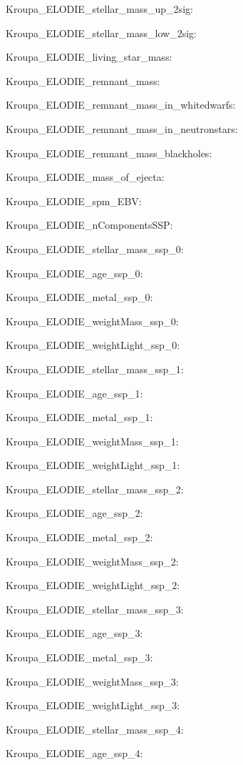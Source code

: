 \item Kroupa\_ELODIE\_stellar\_mass\_up\_2sig: 
\item Kroupa\_ELODIE\_stellar\_mass\_low\_2sig: 
\item Kroupa\_ELODIE\_living\_star\_mass: 
\item Kroupa\_ELODIE\_remnant\_mass: 
\item Kroupa\_ELODIE\_remnant\_mass\_in\_whitedwarfs: 
\item Kroupa\_ELODIE\_remnant\_mass\_in\_neutronstars: 
\item Kroupa\_ELODIE\_remnant\_mass\_blackholes: 
\item Kroupa\_ELODIE\_mass\_of\_ejecta: 
\item Kroupa\_ELODIE\_spm\_EBV: 
\item Kroupa\_ELODIE\_nComponentsSSP: 
\item Kroupa\_ELODIE\_stellar\_mass\_ssp\_0: 
\item Kroupa\_ELODIE\_age\_ssp\_0: 
\item Kroupa\_ELODIE\_metal\_ssp\_0: 
\item Kroupa\_ELODIE\_weightMass\_ssp\_0: 
\item Kroupa\_ELODIE\_weightLight\_ssp\_0: 
\item Kroupa\_ELODIE\_stellar\_mass\_ssp\_1: 
\item Kroupa\_ELODIE\_age\_ssp\_1: 
\item Kroupa\_ELODIE\_metal\_ssp\_1: 
\item Kroupa\_ELODIE\_weightMass\_ssp\_1: 
\item Kroupa\_ELODIE\_weightLight\_ssp\_1: 
\item Kroupa\_ELODIE\_stellar\_mass\_ssp\_2: 
\item Kroupa\_ELODIE\_age\_ssp\_2: 
\item Kroupa\_ELODIE\_metal\_ssp\_2: 
\item Kroupa\_ELODIE\_weightMass\_ssp\_2: 
\item Kroupa\_ELODIE\_weightLight\_ssp\_2: 
\item Kroupa\_ELODIE\_stellar\_mass\_ssp\_3: 
\item Kroupa\_ELODIE\_age\_ssp\_3: 
\item Kroupa\_ELODIE\_metal\_ssp\_3: 
\item Kroupa\_ELODIE\_weightMass\_ssp\_3: 
\item Kroupa\_ELODIE\_weightLight\_ssp\_3: 
\item Kroupa\_ELODIE\_stellar\_mass\_ssp\_4: 
\item Kroupa\_ELODIE\_age\_ssp\_4: 
